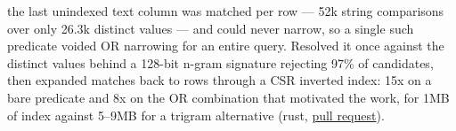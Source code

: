     \item {}the last unindexed text column was matched per row --- 52k string comparisons over only 26.3k distinct values --- and could never narrow, so a single such predicate voided OR narrowing for an entire query. Resolved it once against the distinct values behind a 128-bit n-gram signature rejecting 97\% of candidates, then expanded matches back to rows through a CSR inverted index: 15x on a bare predicate and 8x on the OR combination that motivated the work, for {\mytilde}1MB of index against 5--9MB for a trigram alternative (rust, \href{https://github.com/jbylund/sylvan_librarian/pull/622}{pull request}).
%
%
%
%
%
%
